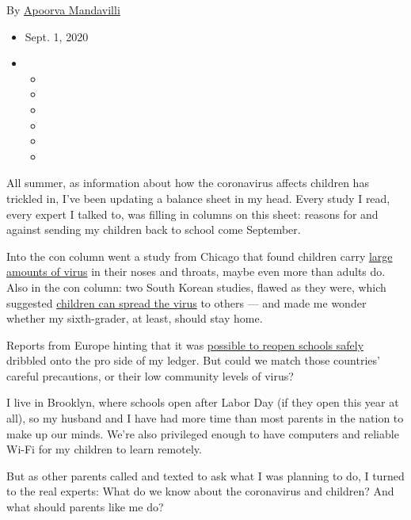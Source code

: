 By
\href{https://www.nytimes3xbfgragh.onion/by/apoorva-mandavilli}{Apoorva
Mandavilli}

\begin{itemize}
\item
  Sept. 1, 2020
\item
  \begin{itemize}
  \item
  \item
  \item
  \item
  \item
  \item
  \end{itemize}
\end{itemize}

All summer, as information about how the coronavirus affects children
has trickled in, I've been updating a balance sheet in my head. Every
study I read, every expert I talked to, was filling in columns on this
sheet: reasons for and against sending my children back to school come
September.

Into the con column went a study from Chicago that found children carry
\href{https://www.nytimes3xbfgragh.onion/2020/07/30/health/coronavirus-children.html}{large
amounts of virus} in their noses and throats, maybe even more than
adults do. Also in the con column: two South Korean studies, flawed as
they were, which suggested
\href{https://www.nytimes3xbfgragh.onion/2020/08/14/health/older-children-and-the-coronavirus-a-new-wrinkle-in-the-debate.html}{children
can spread the virus} to others --- and made me wonder whether my
sixth-grader, at least, should stay home.

Reports from Europe hinting that it was
\href{https://www.nytimes3xbfgragh.onion/2020/07/11/health/coronavirus-schools-reopen.html}{possible
to reopen schools safely} dribbled onto the pro side of my ledger. But
could we match those countries' careful precautions, or their low
community levels of virus?

I live in Brooklyn, where schools open after Labor Day (if they open
this year at all), so my husband and I have had more time than most
parents in the nation to make up our minds. We're also privileged enough
to have computers and reliable Wi-Fi for my children to learn remotely.

But as other parents called and texted to ask what I was planning to do,
I turned to the real experts: What do we know about the coronavirus and
children? And what should parents like me do?

